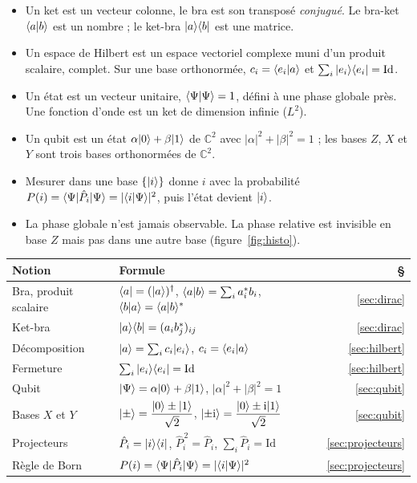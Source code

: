 \begin{aretenir}
\begin{itemize}
  \item Un ket est un vecteur colonne, le bra est son transposé \emph{conjugué}. Le bra-ket
        $\langle a|b\rangle$ est un nombre ; le ket-bra $|a\rangle\langle b|$ est une matrice.
  \item Un espace de Hilbert est un espace vectoriel complexe muni d'un produit scalaire, complet.
        Sur une base orthonormée, $c_i=\langle e_i|a\rangle$ et $\sum_i|e_i\rangle\langle e_i|=\mathrm{Id}$.
  \item Un état est un vecteur unitaire, $\langle \Psi|\Psi\rangle=1$, défini à une phase globale près.
        Une fonction d'onde est un ket de dimension infinie ($L^2$).
  \item Un qubit est un état $\alpha|0\rangle+\beta|1\rangle$ de $\mathbb{C}^2$ avec $|\alpha|^2+|\beta|^2=1$ ;
        les bases $Z$, $X$ et $Y$ sont trois bases orthonormées de $\mathbb{C}^2$.
  \item Mesurer dans une base $\{|i\rangle\}$ donne $i$ avec la probabilité
        $P(i)=\langle \Psi|\hat P_i|\Psi\rangle=|\langle i|\Psi\rangle|^2$, puis l'état devient $|i\rangle$.
  \item La phase globale n'est jamais observable. La phase relative est invisible en base $Z$ mais
        pas dans une autre base (figure~\ref{fig:histo}).
\end{itemize}
\end{aretenir}

\begin{center}
\renewcommand{\arraystretch}{1.45}
\begin{tabular}{@{}l l r@{}}
\toprule
\textbf{Notion} & \textbf{Formule} & \textbf{§} \\
\midrule
Bra, produit scalaire & $\langle a|=(|a\rangle)^\dagger$, \quad $\langle a|b\rangle=\sum_i a_i^*b_i$,
  \quad $\langle b|a\rangle=\langle a|b\rangle^*$ & \ref{sec:dirac} \\
Ket-bra & $|a\rangle\langle b|=(a_ib_j^*)_{ij}$ & \ref{sec:dirac} \\
Décomposition & $|a\rangle=\sum_i c_i|e_i\rangle$, \quad $c_i=\langle e_i|a\rangle$ & \ref{sec:hilbert} \\
Fermeture & $\sum_i|e_i\rangle\langle e_i|=\mathrm{Id}$ & \ref{sec:hilbert} \\
Qubit & $|\Psi\rangle=\alpha|0\rangle+\beta|1\rangle$, \quad $|\alpha|^2+|\beta|^2=1$ & \ref{sec:qubit} \\
Bases $X$ et $Y$ & $|\pm\rangle=\dfrac{|0\rangle\pm|1\rangle}{\sqrt2}$, \quad
  $|{\pm}\mathrm{i}\rangle=\dfrac{|0\rangle\pm\mathrm{i}|1\rangle}{\sqrt2}$ & \ref{sec:qubit} \\
Projecteurs & $\hat P_i=|i\rangle\langle i|$, \quad $\hat P_i^{\,2}=\hat P_i$, \quad
  $\sum_i\hat P_i=\mathrm{Id}$ & \ref{sec:projecteurs} \\
Règle de Born & $P(i)=\langle \Psi|\hat P_i|\Psi\rangle=|\langle i|\Psi\rangle|^2$ & \ref{sec:projecteurs} \\
\bottomrule
\end{tabular}
\end{center}

